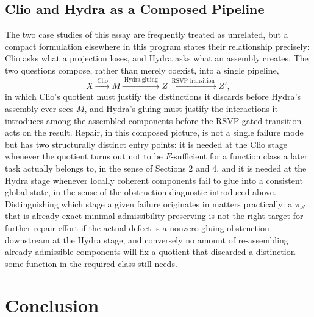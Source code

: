\documentclass[11pt]{article}
\begin{document}
\subsection{Clio and Hydra as a Composed Pipeline}

The two case studies of this essay are frequently treated as unrelated, but a compact formulation elsewhere in this program states their relationship precisely: Clio asks what a projection loses, and Hydra asks what an assembly creates. The two questions compose, rather than merely coexist, into a single pipeline,
\[
X \xrightarrow{\;\mathrm{Clio}\;} M \xrightarrow{\;\mathrm{Hydra\ gluing}\;} Z \xrightarrow{\;\mathrm{RSVP\ transition}\;} Z',
\]
in which Clio's quotient must justify the distinctions it discards before Hydra's assembly ever sees $M$, and Hydra's gluing must justify the interactions it introduces among the assembled components before the RSVP-gated transition acts on the result. Repair, in this composed picture, is not a single failure mode but has two structurally distinct entry points: it is needed at the Clio stage whenever the quotient turns out not to be $F$-sufficient for a function class a later task actually belongs to, in the sense of Sections 2 and 4, and it is needed at the Hydra stage whenever locally coherent components fail to glue into a consistent global state, in the sense of the obstruction diagnostic introduced above. Distinguishing which stage a given failure originates in matters practically: a $\pi_{\mathcal{A}}$ that is already exact minimal admissibility-preserving is not the right target for further repair effort if the actual defect is a nonzero gluing obstruction downstream at the Hydra stage, and conversely no amount of re-assembling already-admissible components will fix a quotient that discarded a distinction some function in the required class still needs.

\section{Conclusion}
\end{document}
